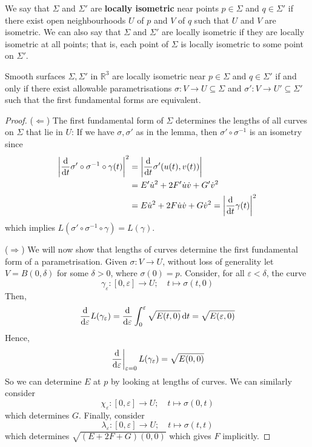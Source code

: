 \documentclass[a4paper,11pt]{article}
\begin{document}
\begin{definition}
	We say that \( \Sigma \) and \( \Sigma' \) are \textbf{locally isometric} near points \( p \in \Sigma \) and \( q \in \Sigma' \) if there exist open neighbourhoods \( U \) of \( p \) and \( V \) of \( q \) such that \( U \) and \( V \) are isometric.
	We can also say that \( \Sigma \) and \( \Sigma' \) are locally isometric if they are locally isometric at all points; that is, each point of \( \Sigma \) is locally isometric to some point on \( \Sigma' \).
\end{definition}
\begin{lemma}
	Smooth surfaces \( \Sigma, \Sigma' \) in \( \mathbb R^3 \) are locally isometric near \( p \in \Sigma \) and \( q \in \Sigma' \) if and only if there exist allowable parametrisations \( \sigma \colon V \to U \subseteq \Sigma \) and \( \sigma' \colon V \to U' \subseteq \Sigma' \) such that the first fundamental forms are equivalent.
\end{lemma}
\begin{proof}
	($ \Longleftarrow $) The first fundamental form of \( \Sigma \) determines the lengths of all curves on \( \Sigma \) that lie in \( U \): If we have $ \sigma,\sigma' $ as in the lemma, then $ \sigma'\circ \sigma^{-1} $ is an isometry since 
	\begin{align*}
		\abs{\dv{}{t}\sigma'\circ \sigma^{-1}\circ \gamma(t)}^2 &= \abs{\dv{}{t}\sigma'(u(t),v(t))}\\ 
		&= E'\dot{u}^2+2F' \dot{u}\dot{v}+G'\dot{v}^2\\ 
		&= E\dot{u}^2+2F \dot{u}\dot{v}+G\dot{v}^2 = \abs{\dv{}{t}\gamma(t)}^2
	\end{align*}
	which implies $ L(\sigma'\circ \sigma^{-1}\circ \gamma) = L(\gamma) $. 

	($\Longrightarrow$) We will now show that lengths of curves determine the first fundamental form of a parametrisation.
	Given \( \sigma \colon V \to U \), without loss of generality let \( V = B(0,\delta) \) for some \( \delta > 0 \), where \( \sigma(0) = p \).
	Consider, for all \( \varepsilon < \delta \), the curve
	\[
		\gamma_\varepsilon \colon [0,\varepsilon] \to U;\quad t \mapsto \sigma(t,0)
	\]
	Then,
	\[
		\dv{\varepsilon} L(\gamma_\varepsilon) = \dv{\varepsilon} \int_0^\varepsilon \sqrt{E(t,0)} \dd{t} = \sqrt{E(\varepsilon,0)}
	\]
	Hence,
	\[
		\eval{\dv{\varepsilon}}_{\varepsilon = 0} L(\gamma_\varepsilon) = \sqrt{E(0,0)}
	\]
	So we can determine \( E \) at \( p \) by looking at lengths of curves.
	We can similarly consider
	\[
		\chi_\varepsilon \colon [0,\varepsilon] \to U;\quad t \mapsto \sigma(0,t)
	\]
	which determines \( G \).
	Finally, consider
	\[
		\lambda_\varepsilon \colon [0,\varepsilon] \to U;\quad t \mapsto \sigma(t,t)
	\]
	which determines \( \sqrt{(E+2F+G)(0,0)} \) which gives \( F \) implicitly.
\end{proof}
\end{document}

